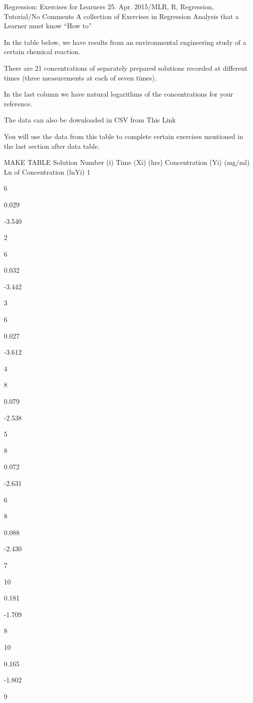 \documentclass[a4paper,12pt]{article}
\begin{document}

Regression: Exercises for Learners
25. Apr. 2015/MLR, R, Regression, Tutorial/No Comments
A collection of Exercises in Regression Analysis that a Learner must know “How to”

In the table below, we have results from an environmental engineering study of a certain chemical reaction.

There are 21 concentrations of separately prepared solutions recorded at different times (three measurements at each of seven times).

In the last column we have natural logarithms of the concentrations for your reference.

The data can also be downloaded in CSV from This Link

You will use the data from this table to complete certain exercises mentioned in the last section after data table.

MAKE TABLE 
Solution Number
(i)
Time (Xi)
(hrs)
Concentration (Yi)
(mg/ml)
Ln of Concentration
(lnYi)
1

6

0.029

-3.540

2

6

0.032

-3.442

3

6

0.027

-3.612

4

8

0.079

-2.538

5

8

0.072

-2.631

6

8

0.088

-2.430

7

10

0.181

-1.709

8

10

0.165

-1.802

9
\end{document}

